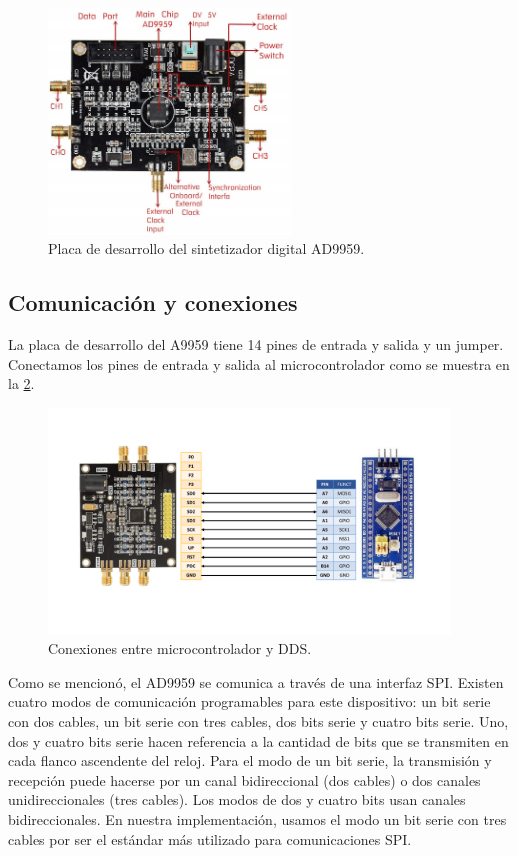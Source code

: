 \documentclass{article}
\newenvironment{standalone}{\begin{preview}}{\end{preview}}
\begin{document}
\begin{standalone}
  \begin{figure}[!htbp]
    \centering
    \includegraphics[width=\linewidth, height=60mm, keepaspectratio]{../images/ad9959.jpg}
    \caption{Placa de desarrollo del sintetizador digital AD9959.}
    \label{fig:ad9959}
  \end{figure}

  \subsection{Comunicación y conexiones}

  La placa de desarrollo del A9959 tiene 14 pines de entrada y salida y un jumper.
  Conectamos los pines de entrada y salida al microcontrolador como se muestra en la \cref{fig:conexiones}.

  \begin{figure}[!htbp]
    \centering
    \includegraphics[trim=40pt 100pt 40pt 100pt, clip, width=\linewidth, height=60mm, keepaspectratio]{../images/conexiones.pdf}
    \caption{Conexiones entre microcontrolador y DDS.}
    \label{fig:conexiones}
  \end{figure}

  Como se mencionó, el AD9959 se comunica a través de una interfaz SPI.
  Existen cuatro modos de comunicación programables para este dispositivo: un bit serie con dos cables, un bit serie con tres cables, dos bits serie y cuatro bits serie.
  Uno, dos y cuatro bits serie hacen referencia a la cantidad de bits que se transmiten en cada flanco ascendente del reloj.
  Para el modo de un bit serie, la transmisión y recepción puede hacerse por un canal bidireccional (dos cables) o dos canales unidireccionales (tres cables).
  Los modos de dos y cuatro bits usan canales bidireccionales.
  En nuestra implementación, usamos el modo un bit serie con tres cables por ser el estándar más utilizado para comunicaciones SPI.


\end{standalone}
\end{document}
